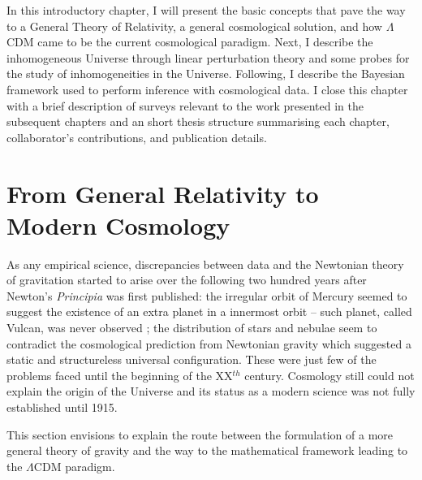 \qquad In this introductory chapter, I will present the basic concepts that pave the way to a General Theory of Relativity, a general cosmological solution, and how $\Lambda$CDM came to be the current cosmological paradigm. Next, I describe the inhomogeneous Universe through linear perturbation theory and some probes for the study of inhomogeneities in the Universe. Following, I describe the Bayesian framework used to perform inference with cosmological data. I close this chapter with a brief description of surveys relevant to the work presented in the subsequent chapters and an short thesis structure summarising each chapter, collaborator's contributions, and publication details. 

\section{From General Relativity to Modern Cosmology} \label{Sec:Intro:GR}
As any empirical science, discrepancies between data and the Newtonian theory of gravitation started to arise over the following two hundred years after Newton's \textit{Principia} was first published: the irregular orbit of Mercury seemed to suggest the existence of an extra planet in a innermost orbit -- such planet, called Vulcan, was never observed \citep{1859Mercury}; the distribution of stars and nebulae seem to contradict the cosmological prediction from Newtonian gravity which suggested a static and structureless universal configuration. These were just few of the problems faced until the beginning of the XX$^{th}$ century. Cosmology still could not explain the origin of the Universe and its status as a modern science was not fully established until 1915.

\qquad This section envisions to explain the route between the formulation of a more general theory of gravity and the way to the mathematical framework leading to the $\Lambda$CDM paradigm.


